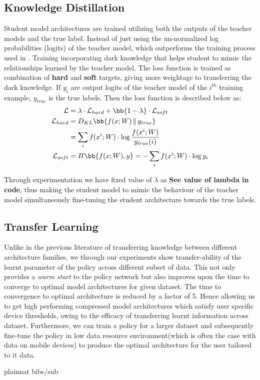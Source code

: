 \documentclass[../main]{subfiles}
\begin{document}
\subsection{Knowledge Distillation}
Student model architectures are trained utilizing both the outputs of the teacher models and the true label.
Instead of just using the un-normalized log probabilities (logits) of the teacher model, which outperforms the training process used in \cite{ashok2017n2n}.
Training incorporating dark knowledge \cite{hinton2015distilling} that helps student to mimic the relationships learned by the teacher model.
The loss function is trained as combination of \textbf{hard} and \textbf{soft} targets, giving more weightage to transferring the dark knowledge.
If $y_{i}$ are output logits of the teacher model of the $i^{th}$ training example, $y_{true}$ is the true labels.
Then the loss function is described below as:
\begin{align}
    \mathcal{L} & = \lambda\cdot\mathcal{L}_{hard} + \bb{1-\lambda}\cdot\mathcal{L}_{soft}   \\
    \mathcal{L}_{hard} & = D_{KL}\bb{f(x; W) \,\Vert\, y_{true}}    \notag \\
    & = \sum_{i} f(x^{i}; W) \cdot \log\frac{f(x^{i}; W)}{y_{true}(i)}   \\
    \mathcal{L}_{soft} & = H\bb{f(x; W), y} = - \sum_{i} f(x^{i}; W) \cdot \log{y_{i}}
\end{align}

Through experimentation we have fixed value of $\lambda$ as \textbf{See value of lambda in code}, thus making the student model to mimic the behaviour of the teacher model simultaneously fine-tuning the student architecture towards the true labels.

\subsection{Transfer Learning}

Unlike in the previous literature \citep{ashok2017n2n,zoph2017learning} of transferring knowledge between different architecture families, we through our experiments show transfer-ability of the learnt parameter of the policy across different subset of data.
This not only provides a \textit{warm start} to the policy network but also improves upon the time to converge to optimal model architectures for given dataset.
The time to convergence to optimal architecture is reduced by a factor of 5.
Hence allowing us to get high performing compressed model architectures which satisfy user specific device thresholds, owing to the efficacy of transferring learnt information across dataset.
Furthermore, we can train a policy for a larger dataset and subsequently fine-tune the policy in low data resource environment(which is often the case with data on mobile devices) to produce the optimal architecture for the user tailored to it data.


\bibsubfile
{plainnat}
{bibs/sub}
\end{document}
